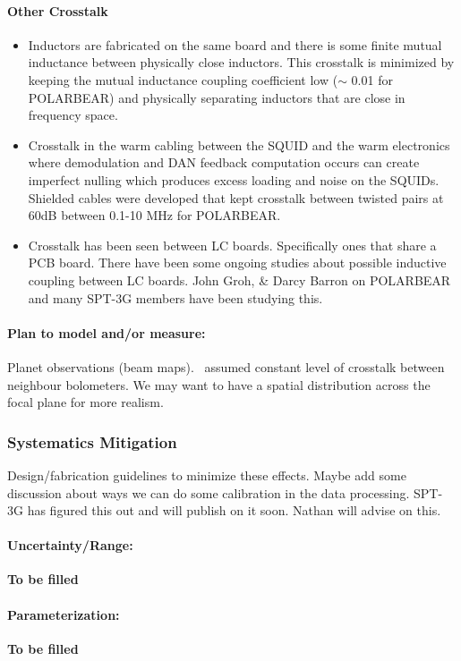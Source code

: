 \paragraph{Other Crosstalk}
\begin{itemize}
\item Inductors are fabricated on the same board and there is some finite mutual inductance between physically close inductors. This crosstalk is minimized by keeping the mutual inductance coupling coefficient low ($\sim$ 0.01 for POLARBEAR) and physically separating inductors that are close in frequency space. 
\item Crosstalk in the warm cabling between the SQUID and the warm electronics where demodulation and DAN feedback computation occurs can create imperfect nulling which produces excess loading and noise on the SQUIDs. Shielded cables were developed that kept crosstalk between twisted pairs at 60dB between 0.1-10 MHz for POLARBEAR.
\item Crosstalk has been seen between LC boards. Specifically ones that share a PCB board. There have been some ongoing studies about possible inductive coupling between LC boards. John Groh, \& Darcy Barron on POLARBEAR and many SPT-3G members have been studying this.
\end{itemize}

\paragraph{Plan to model and/or measure:}
Planet observations (beam maps). \pb\ assumed constant level of crosstalk between neighbour bolometers. We may want to have a spatial distribution across the focal plane for more realism.
\subsubsection{Systematics Mitigation}
Design/fabrication guidelines to minimize these effects. Maybe add some discussion about ways we can do some calibration in the data processing. SPT-3G has figured this out and will publish on it soon. Nathan will advise on this.

\paragraph{Uncertainty/Range:}
\textbf{To be filled}
\paragraph{Parameterization:}
\textbf{To be filled}

